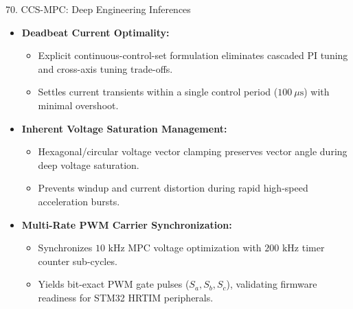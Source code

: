 \documentclass[aspectratio=169]{beamer}
\begin{document}
\begin{frame}{70. CCS-MPC: Deep Engineering Inferences}
    \begin{itemize}
        \item \textbf{Deadbeat Current Optimality:}
        \begin{itemize}
            \item Explicit continuous-control-set formulation eliminates cascaded PI tuning and cross-axis tuning trade-offs.
            \item Settles current transients within a single control period ($100\ \mu\text{s}$) with minimal overshoot.
        \end{itemize}
        \item \textbf{Inherent Voltage Saturation Management:}
        \begin{itemize}
            \item Hexagonal/circular voltage vector clamping preserves vector angle during deep voltage saturation.
            \item Prevents windup and current distortion during rapid high-speed acceleration bursts.
        \end{itemize}
        \item \textbf{Multi-Rate PWM Carrier Synchronization:}
        \begin{itemize}
            \item Synchronizes $10\text{ kHz}$ MPC voltage optimization with $200\text{ kHz}$ timer counter sub-cycles.
            \item Yields bit-exact PWM gate pulses ($S_a, S_b, S_c$), validating firmware readiness for STM32 HRTIM peripherals.
        \end{itemize}
    \end{itemize}
\end{frame}

\end{document}
